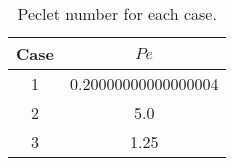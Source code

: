 \begin{table}[htbp]
	 \centering
	 \caption{Peclet number for each case.}
	 \begin{tabular}{cc}
		 \toprule
		 Case & $Pe$ \\ 
		 \midrule 
		 1 & 0.20000000000000004 \\ 
		 2 & 5.0 \\ 
		 3 & 1.25 \\ 
		 \bottomrule 
	 \end{tabular} 
	 \label{tab:Pe} 
\end{table}